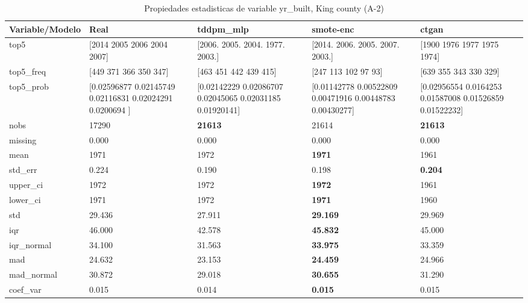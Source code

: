 \begin{table}[H]
\centering
\fontsize{8}{14}\selectfont
\caption{Propiedades  estadisticas de variable yr\_built, King county (A-2)}
\label{table-stats-king county-a-2-yr_built}
\begin{tabular}{|l|m{10em}|m{10em}|m{10em}|m{10em}|}
\hline
 \rowcolor[gray]{0.8}
Variable/Modelo & Real & tddpm\_mlp & smote-enc & ctgan \\
\hline top5 & [2014 2005 2006 2004 2007] & [2006. 2005. 2004. 1977. 2003.] & [2014. 2006. 2005. 2007. 2003.] & [1900 1976 1977 1975 1974] \\
\hline top5\_freq & [449 371 366 350 347] & [463 451 442 439 415] & [247 113 102  97  93] & [639 355 343 330 329] \\
\hline top5\_prob & [0.02596877 0.02145749 0.02116831 0.02024291 0.0200694 ] & [0.02142229 0.02086707 0.02045065 0.02031185 0.01920141] & [0.01142778 0.00522809 0.00471916 0.00448783 0.00430277] & [0.02956554 0.0164253  0.01587008 0.01526859 0.01522232] \\
\hline nobs & 17290 & \bfseries 21613 & \cellcolor[rgb]{0.9, 0.54, 0.52} 21614 & \bfseries 21613 \\
\hline missing & 0.000 & 0.000 & 0.000 & 0.000 \\
\hline mean & 1971 & 1972 & \bfseries 1971 & \cellcolor[rgb]{0.9, 0.54, 0.52} 1961 \\
\hline std\_err & 0.224 & \cellcolor[rgb]{0.9, 0.54, 0.52} 0.190 & 0.198 & \bfseries 0.204 \\
\hline upper\_ci & 1972 & 1972 & \bfseries 1972 & \cellcolor[rgb]{0.9, 0.54, 0.52} 1961 \\
\hline lower\_ci & 1971 & 1972 & \bfseries 1971 & \cellcolor[rgb]{0.9, 0.54, 0.52} 1960 \\
\hline std & 29.436 & \cellcolor[rgb]{0.9, 0.54, 0.52} 27.911 & \bfseries 29.169 & 29.969 \\
\hline iqr & 46.000 & \cellcolor[rgb]{0.9, 0.54, 0.52} 42.578 & \bfseries 45.832 & 45.000 \\
\hline iqr\_normal & 34.100 & \cellcolor[rgb]{0.9, 0.54, 0.52} 31.563 & \bfseries 33.975 & 33.359 \\
\hline mad & 24.632 & \cellcolor[rgb]{0.9, 0.54, 0.52} 23.153 & \bfseries 24.459 & 24.966 \\
\hline mad\_normal & 30.872 & \cellcolor[rgb]{0.9, 0.54, 0.52} 29.018 & \bfseries 30.655 & 31.290 \\
\hline coef\_var & 0.015 & \cellcolor[rgb]{0.9, 0.54, 0.52} 0.014 & \bfseries 0.015 & 0.015 \\

\end{tabular}
\end{table}
